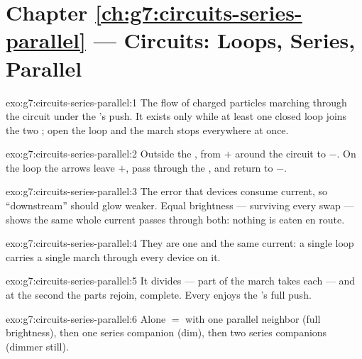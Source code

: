 \section*{Chapter \ref{ch:g7:circuits-series-parallel} --- Circuits: Loops, Series, Parallel}

\begin{solution}{exo:g7:circuits-series-parallel:1}
The flow of charged particles marching through the circuit under
the 's push. It exists only while at least one closed loop
joins the two ; open the loop and the march stops
everywhere at once.
\end{solution}

\begin{solution}{exo:g7:circuits-series-parallel:2}
Outside the , from $+$ around the circuit to $-$. On the
 loop the arrows leave $+$, pass through the , and
return to $-$.
\end{solution}

\begin{solution}{exo:g7:circuits-series-parallel:3}
The error that devices consume current, so ``downstream'' 
should glow weaker. Equal brightness --- surviving every swap ---
shows the same whole current passes through both: nothing is
eaten en route.
\end{solution}

\begin{solution}{exo:g7:circuits-series-parallel:4}
They are one and the same current: a single loop carries a single
march through every device on it.
\end{solution}

\begin{solution}{exo:g7:circuits-series-parallel:5}
It divides --- part of the march takes each  --- and at the
second  the parts rejoin, complete. Every  enjoys
the 's full push.
\end{solution}

\begin{solution}{exo:g7:circuits-series-parallel:6}
Alone $=$ with one parallel neighbor (full brightness), then one
series companion (dim), then two series companions (dimmer
still).
\end{solution}

